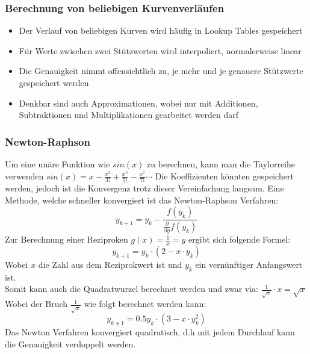 \subsubsection{Berechnung von beliebigen Kurvenverläufen}
\begin{itemize}
	\item Der Verlauf von beliebigen Kurven wird häufig in Lookup Tables gespeichert
	\item Für Werte zwischen zwei Stützwerten wird interpoliert, normalerweise linear
	\item Die Genauigkeit nimmt offensichtlich zu, je mehr und je genauere Stützwerte gespeichert werden
	\item Denkbar sind auch Approximationen, wobei nur mit Additionen, Subtraktionen und Multiplikationen gearbeitet werden darf	
\end{itemize}

\subsubsection{Newton-Raphson}
Um eine unäre Funktion wie $sin(x)$ zu berechnen, kann man die Taylorreihe verwenden $sin(x) = x - \frac{x^3}{3!} + \frac{x^5}{5!} - \frac{x^7}{7!}\cdots$ Die Koeffizienten könnten gespeichert werden, jedoch ist die Konvergenz trotz dieser Vereinfachung langsam. 
Eine Methode, welche schneller konvergiert ist das Newton-Raphson Verfahren: 
\begin{equation}
y_{k+1} = y_k - \frac{f(y_k)}{\frac{\partial}{\partial y}f(y_k)}
\end{equation}
Zur Berechnung einer Reziproken $g(x)=\frac{1}{x}=y$ ergibt sich folgende Formel: 
\begin{equation}
y_{k+1} = y_k\cdot (2-x\cdot y_k)
\end{equation}
Wobei $x$ die Zahl aus dem Reziprokwert ist und $y_k$ ein vernünftiger Anfangswert ist. \\

Somit kann auch die Quadratwurzel berechnet werden und zwar via: $\frac{1}{\sqrt{x}} \cdot x = \sqrt{x}$\\
Wobei der Bruch $\frac{1}{\sqrt{x}}$ wie folgt berechnet werden kann:
\begin{equation}
y_{k+1} = 0.5y_k\cdot (3-x\cdot y_k^2)
\end{equation}
Das Newton Verfahren konvergiert quadratisch, d.h mit jedem Durchlauf kann die Genauigkeit verdoppelt werden.

